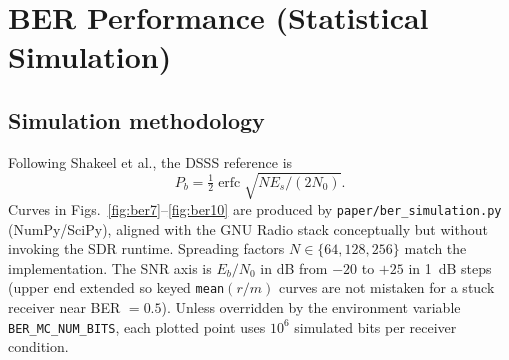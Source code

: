 \documentclass[10pt,a4paper,twocolumn]{article}
\begin{document}
\begin{table}[t]
\centering
\caption{gr-k-gdss pytest modules (snapshot: 42 passed, 1 skipped).}
\scriptsize
{}
\end{table}

\FloatBarrier
\clearpage
\section{BER Performance (Statistical Simulation)}
\onecolumn
\subsection{Simulation methodology}
Following Shakeel et al., the DSSS reference is
\begin{equation}
P_b = \tfrac12\operatorname{erfc}\!\sqrt{N E_s/(2N_0)}.
\label{eq:dsss}
\end{equation}
Curves in Figs.~\ref{fig:ber7}--\ref{fig:ber10} are produced by \texttt{paper/ber\_simulation.py} (NumPy/SciPy), aligned with the GNU Radio stack conceptually but without invoking the SDR runtime. Spreading factors $N\in\{64,128,256\}$ match the implementation. The SNR axis is $E_b/N_0$ in dB from $-20$ to $+25$ in 1~dB steps (upper end extended so keyed \texttt{mean}$(r/m)$ curves are not mistaken for a stuck receiver near BER $=0.5$). Unless overridden by the environment variable \texttt{BER\_MC\_NUM\_BITS}, each plotted point uses $10^6$ simulated bits per receiver condition.
\end{document}
